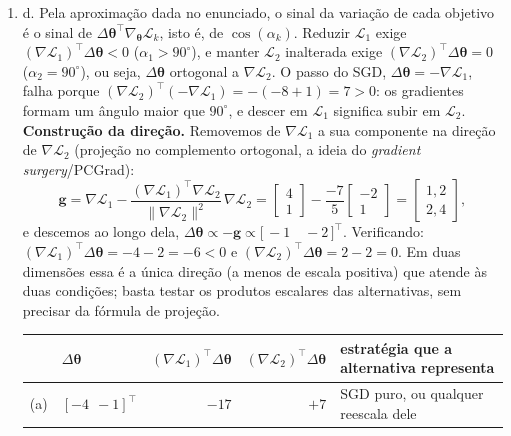 \documentclass{dlproblemset}
\begin{document}
\begin{enumerate}[1)]
    \item d. Pela aproximação dada no enunciado, o sinal da variação de cada objetivo é o sinal de $\Delta\boldsymbol{\theta}^{\top}\nabla_{\boldsymbol{\theta}}\mathcal{L}_k$, isto é, de $\cos(\alpha_k)$. Reduzir $\mathcal{L}_1$ exige $(\nabla\mathcal{L}_1)^{\top}\Delta\boldsymbol{\theta} < 0$ ($\alpha_1 > 90^{\circ}$), e manter $\mathcal{L}_2$ inalterada exige $(\nabla\mathcal{L}_2)^{\top}\Delta\boldsymbol{\theta} = 0$ ($\alpha_2 = 90^{\circ}$), ou seja, $\Delta\boldsymbol{\theta}$ ortogonal a $\nabla\mathcal{L}_2$. O passo do SGD, $\Delta\boldsymbol{\theta} = -\nabla\mathcal{L}_1$, falha porque $(\nabla\mathcal{L}_2)^{\top}(-\nabla\mathcal{L}_1) = -(-8 + 1) = 7 > 0$: os gradientes formam um ângulo maior que $90^{\circ}$, e descer em $\mathcal{L}_1$ significa subir em $\mathcal{L}_2$. \textbf{Construção da direção.} Removemos de $\nabla\mathcal{L}_1$ a sua componente na direção de $\nabla\mathcal{L}_2$ (projeção no complemento ortogonal, a ideia do \textit{gradient surgery}/PCGrad):
    \[
    \mathbf{g} = \nabla\mathcal{L}_1 - \frac{(\nabla\mathcal{L}_1)^{\top}\nabla\mathcal{L}_2}{\|\nabla\mathcal{L}_2\|^{2}}\,\nabla\mathcal{L}_2
    = \begin{bmatrix} 4 \\ 1 \end{bmatrix} - \frac{-7}{5}\begin{bmatrix} -2 \\ 1 \end{bmatrix}
    = \begin{bmatrix} 1{,}2 \\ 2{,}4 \end{bmatrix},
    \]
    e descemos ao longo dela, $\Delta\boldsymbol{\theta} \propto -\mathbf{g} \propto \bigl[\,-1 \quad -2\,\bigr]^{\top}$. Verificando: $(\nabla\mathcal{L}_1)^{\top}\Delta\boldsymbol{\theta} = -4 - 2 = -6 < 0$ e $(\nabla\mathcal{L}_2)^{\top}\Delta\boldsymbol{\theta} = 2 - 2 = 0$. Em duas dimensões essa é a única direção (a menos de escala positiva) que atende às duas condições; basta testar os produtos escalares das alternativas, sem precisar da fórmula de projeção.
    \begin{center}
    \begin{tabular}{clrrl}
    & $\Delta\boldsymbol{\theta}$ & $(\nabla\mathcal{L}_1)^{\top}\Delta\boldsymbol{\theta}$ & $(\nabla\mathcal{L}_2)^{\top}\Delta\boldsymbol{\theta}$ & estratégia que a alternativa representa \\\hline
    (a) & $[-4\ \ -1]^{\top}$ & $-17$ & $+7$ & SGD puro, ou qualquer reescala dele \\

\end{tabular}
\end{center}
\end{enumerate}
\end{document}
